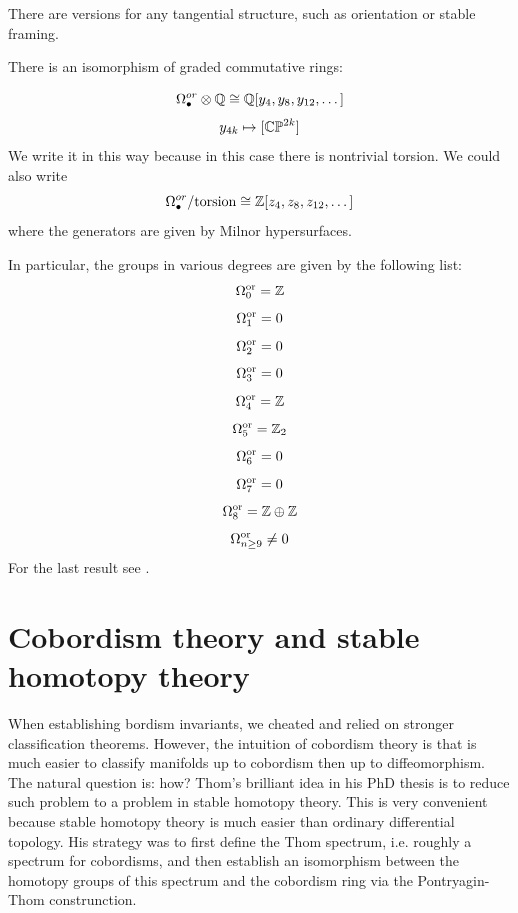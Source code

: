 There are versions for any tangential structure, such as orientation or stable framing.

\begin{thm}
    There is an isomorphism of \Z graded commutative rings:
    
    \begin{equation*}
        \Omega_\bullet^{or} \otimes \mathbb{Q} \cong \mathbb{Q}[y_4, y_8, y_{12}, \dots]
    \end{equation*}
     $$  y_{4k}\mapsto [\mathbb{C}\mathbb{P}^{2k}]$$
     We write it in this way because in this case there is nontrivial torsion. We could also write
       $$ \Omega_\bullet^{or} /\text{torsion} \cong \mathbb{Z}[z_4, z_8, z_{12}, \dots]$$
    where the generators are given by Milnor hypersurfaces.
\end{thm}
\begin{ex}
In particular, the groups in various degrees are given by the following list:
$$ \Omega_{0}^{\operatorname{or}}=\mathbb{Z}$$
$$ \Omega_{1}^{\operatorname{or}}=0$$
$$ \Omega_{2}^{\operatorname{or}}=0$$
$$ \Omega_{3}^{\operatorname{or}}=0$$
$$ \Omega_{4}^{\operatorname{or}}=\mathbb{Z}$$
$$ \Omega_{5}^{\operatorname{or}}=\mathbb{Z}_2$$
$$ \Omega_{6}^{\operatorname{or}}=0$$
$$ \Omega_{7}^{\operatorname{or}}=0$$
$$ \Omega_{8}^{\operatorname{or}}=\mathbb{Z}\oplus\mathbb{Z}$$
$$ \Omega_{n\geq 9}^{\operatorname{or}}\neq 0$$
For the last result see \cite[p. 203]{MilnorS05}.
\end{ex}
\section{Cobordism theory and stable homotopy theory \extra}
When establishing bordism invariants, we cheated and relied on stronger classification theorems.
However, the intuition of cobordism theory is that is much easier to classify manifolds up to cobordism
then up to diffeomorphism.
The natural question is: how? Thom's brilliant idea in his PhD thesis is to reduce such problem to 
a problem in stable homotopy theory. This is very convenient because stable homotopy theory is much
easier than ordinary differential topology. His strategy was to first define the Thom spectrum, i.e.
roughly a spectrum for cobordisms, and then establish an isomorphism between the homotopy groups
 of this spectrum and the cobordism ring via the Pontryagin-Thom construnction.
 
